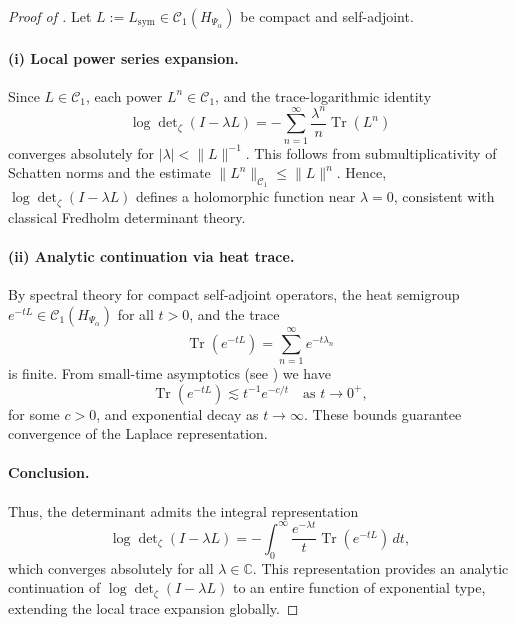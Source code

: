 \begin{proof}[Proof of ]
Let \( L := L_{\mathrm{sym}} \in \mathcal{C}_1(H_{\Psi_\alpha}) \) be compact and self-adjoint.

\paragraph{(i) Local power series expansion.}
Since \( L \in \mathcal{C}_1 \), each power \( L^n \in \mathcal{C}_1 \), and the trace-logarithmic identity
\[
\log \det\nolimits_\zeta(I - \lambda L)
= - \sum_{n=1}^\infty \frac{\lambda^n}{n} \operatorname{Tr}(L^n)
\]
converges absolutely for \( |\lambda| < \|L\|^{-1} \). This follows from submultiplicativity of Schatten norms and the estimate \( \|L^n\|_{\mathcal{C}_1} \le \|L\|^n \). Hence, \( \log \det\nolimits_\zeta(I - \lambda L) \) defines a holomorphic function near \( \lambda = 0 \), consistent with classical Fredholm determinant theory.

\paragraph{(ii) Analytic continuation via heat trace.}
By spectral theory for compact self-adjoint operators, the heat semigroup \( e^{-tL} \in \mathcal{C}_1(H_{\Psi_\alpha}) \) for all \( t > 0 \), and the trace
\[
\operatorname{Tr}(e^{-tL}) = \sum_{n=1}^\infty e^{-t\lambda_n}
\]
is finite. From small-time asymptotics (see ) we have
\[
\operatorname{Tr}(e^{-tL}) \lesssim t^{-1} e^{-c/t} \quad \text{as } t \to 0^+,
\]
for some \( c > 0 \), and exponential decay as \( t \to \infty \). These bounds guarantee convergence of the Laplace representation.

\paragraph{Conclusion.}
Thus, the determinant admits the integral representation
\[
\log \det\nolimits_\zeta(I - \lambda L)
= - \int_0^\infty \frac{e^{-\lambda t}}{t} \operatorname{Tr}(e^{-tL}) \, dt,
\]
which converges absolutely for all \( \lambda \in \mathbb{C} \). This representation provides an analytic continuation of \( \log \det\nolimits_\zeta(I - \lambda L) \) to an entire function of exponential type, extending the local trace expansion globally.
\end{proof}

